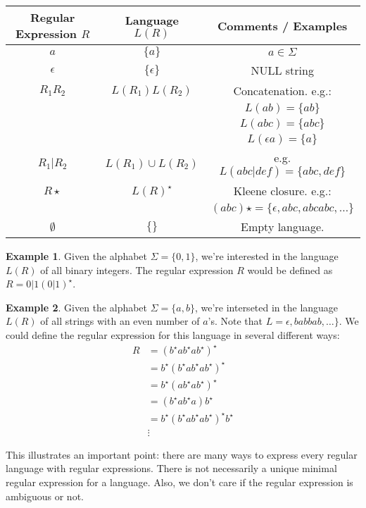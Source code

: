 \documentclass[]{article}
\theoremstyle{definition}
\newtheorem{ex}{Example}[section]
\begin{document}
			\begin{center}
				\begin{tabular}{c|c|c}
					Regular Expression $R$ & Language $L(R)$ & Comments / Examples \\ \hline
					$a$ & $\{ a \}$ & $a \in \Sigma$ \\
					$\epsilon$ & $\{ \epsilon \}$ &  NULL string \\
					$R_1 R_2$ & $L(R_1) L(R_2)$ & Concatenation. e.g.:  \\
					& & $L(ab) = \{ab\}$ \\
					& & $L(abc) = \{abc\}$ \\
					& & $L(\epsilon a) = \{a\}$ \\
					$R_1 | R_2$ & $L(R_1) \cup L(R_2)$ & e.g. $L(abc | def) = \{abc, def\}$ \\
					$R \star$ & $L(R)^\star$ & Kleene closure. e.g.: \\
					& & $(abc) \star = \{ \epsilon, abc, abcabc, \ldots \}$ \\
					$\emptyset$ & $\{ \}$ & Empty language.
				\end{tabular}
			\end{center}

			\begin{ex}
				Given the alphabet $\Sigma = \{ 0, 1 \}$, we're interested in the language $L(R)$ of all binary integers. The regular expression $R$ would be defined as $R = 0 | 1(0 | 1)^\star$.
			\end{ex}

			\begin{ex}
				Given the alphabet $\Sigma = \{ a, b \}$, we're interseted in the language $L(R)$ of all strings with an even number of $a$'s. Note that $L = \epsilon, babbab, \ldots \}$. We could define the regular expression for this language in several different ways:
				\begin{align*}
					R &= (b^\star{} ab^\star{} ab^\star{})^\star \\
					&= b^\star{}(b^\star{}ab^\star{}ab^\star{})^\star \\
					&= b^\star{}(ab^\star{}ab^\star{})^\star \\
					&= (b^\star{}ab^\star{}a)b^\star \\
					&= b^\star{}(b^\star{}ab^\star{}ab^\star{})^\star{} b^\star \\
					&\vdots
				\end{align*}

				This illustrates an important point: there are many ways to express every regular language with regular expressions. There is not necessarily a unique minimal regular expression for a language. Also, we don't care if the regular expression is ambiguous or not.
			\end{ex}
			
\end{document}
